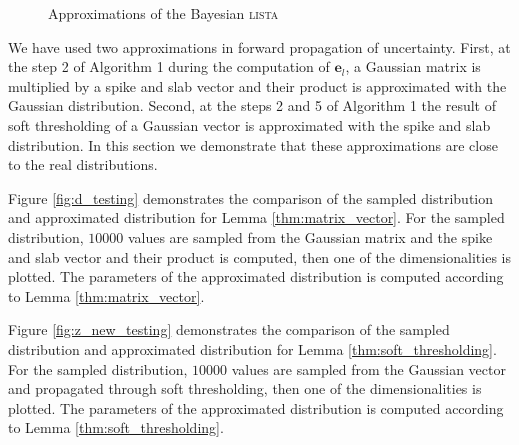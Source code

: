 \documentclass{article}
\begin{document}
\begin{figure}[h]
\centering
{}
\caption{Approximations of the Bayesian \textsc{lista}}
\end{figure}

We have used two approximations in forward propagation of uncertainty. First, at the step 2 of Algorithm 1 during the computation of $\mathbf{e}_l$, a Gaussian matrix is multiplied by a spike and slab vector and their product is approximated with the Gaussian distribution. Second, at the steps 2 and 5 of Algorithm 1 the result of soft thresholding of a Gaussian vector is approximated with the spike and slab distribution. In this section we demonstrate that these approximations are close to the real distributions.

Figure \ref{fig:d_testing} demonstrates the comparison of the sampled distribution and approximated distribution for Lemma \ref{thm:matrix_vector}. For the sampled distribution, $10000$ values are sampled from the Gaussian matrix and the spike and slab vector and their product is computed, then one of the dimensionalities is plotted. The parameters of the approximated distribution is computed according to Lemma \ref{thm:matrix_vector}.

Figure \ref{fig:z_new_testing} demonstrates the comparison of the sampled distribution and approximated distribution for Lemma \ref{thm:soft_thresholding}. For the sampled distribution, $10000$ values are sampled from the Gaussian vector and propagated through soft thresholding, then one of the dimensionalities is plotted. The parameters of the approximated distribution is computed according to Lemma \ref{thm:soft_thresholding}.
\end{document}
